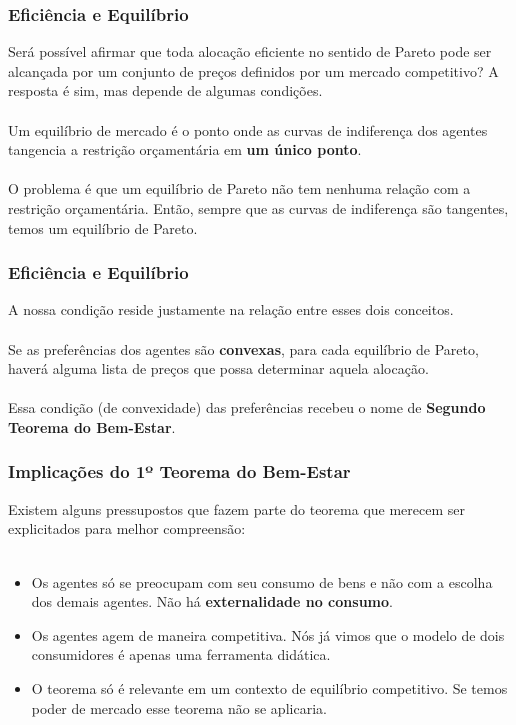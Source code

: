 \documentclass{beamer}[10]
\begin{document}
\begin{frame}
	\frametitle{Eficiência e Equilíbrio}

	Será possível afirmar que toda alocação eficiente no sentido de Pareto pode ser alcançada por um conjunto de preços definidos por um mercado competitivo? A resposta é sim, mas depende de algumas condições.
	\\~\\
	Um equilíbrio de mercado é o ponto onde as curvas de indiferença dos agentes tangencia a restrição orçamentária em \textbf{um único ponto}.
	\\~\\
	O problema é que um equilíbrio de Pareto não tem nenhuma relação com a restrição orçamentária. Então, sempre que as curvas de indiferença são tangentes, temos um equilíbrio de Pareto.
\end{frame}

\begin{frame}
	\frametitle{Eficiência e Equilíbrio}

	A nossa condição reside justamente na relação entre esses dois conceitos.
	\\~\\
	Se as preferências dos agentes são \textbf{convexas}, para cada equilíbrio de Pareto, haverá alguma lista de preços que possa determinar aquela alocação.
	\\~\\
	Essa condição (de convexidade) das preferências recebeu o nome de \textbf{Segundo Teorema do Bem-Estar}.

\end{frame}

\begin{frame}
	\frametitle{Implicações do 1º Teorema do Bem-Estar}

	Existem alguns pressupostos que fazem parte do teorema que merecem ser explicitados para melhor compreensão:
	\\~\\
	\begin{itemize}
		\item Os agentes só se preocupam com seu consumo de bens e não com a escolha dos demais agentes. Não há \textbf{externalidade no consumo}.

		\item Os agentes agem de maneira competitiva. Nós já vimos que o modelo de dois consumidores é apenas uma ferramenta didática.

		\item O teorema só é relevante em um contexto de equilíbrio competitivo. Se temos poder de mercado esse teorema não se aplicaria.
	\end{itemize}

\end{frame}
\end{document}
